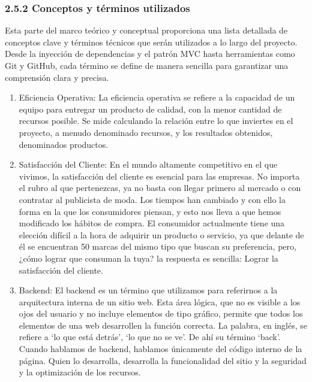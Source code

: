 


\subsubsection{2.5.2 Conceptos y términos utilizados}
Esta parte del marco teórico y conceptual proporciona una lista detallada de conceptos clave y términos técnicos que serán utilizados a lo largo del proyecto. Desde la inyección de dependencias y el patrón MVC hasta herramientas como Git y GitHub, cada término se define de manera sencilla para garantizar una comprensión clara y precisa.

\begin{enumerate}
    \item Eficiencia Operativa: La eficiencia operativa se refiere a la capacidad de un equipo para entregar un producto de calidad, con la menor cantidad de recursos posible. Se mide calculando la relación entre lo que inviertes en el proyecto, a menudo denominado recursos, y los resultados obtenidos, denominados productos.\citep{asanaWantMore}
    \item Satisfacción del Cliente: En el mundo altamente competitivo en el que vivimos, la satisfacción del cliente es esencial para las empresas. No importa el rubro al que pertenezcas, ya no basta con llegar primero al mercado o con contratar al publicista de moda. Los tiempos han cambiado y con ello la forma en la que los consumidores piensan, y esto nos lleva a que hemos modificado los hábitos de compra. El consumidor actualmente tiene una elección difícil a la hora de adquirir un producto o servicio, ya que delante de él se encuentran 50 marcas del mismo tipo que buscan su preferencia, pero, ¿cómo lograr que consuman la tuya? la respuesta es sencilla: Lograr la satisfacción del cliente.\citep{questionproSatisfaccinCliente}
    \item Backend: El backend es un término que utilizamos para referirnos a la arquitectura interna de un sitio web. Esta área lógica, que no es visible a los ojos del usuario y no incluye elementos de tipo gráfico, permite que todos los elementos de una web desarrollen la función correcta.
    La palabra, en inglés, se refiere a ‘lo que está detrás’, ‘lo que no se ve’. De ahí su término ‘back’. Cuando hablamos de backend, hablamos únicamente del código interno de la página. Quien lo desarrolla, desarrolla la funcionalidad del sitio y la seguridad y la optimización de los recursos.\citep{devcampQuBackend}

\end{enumerate}
